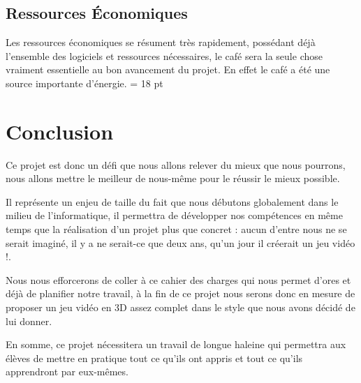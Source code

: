 \documentclass[12pt,a4paper]{article}
\begin{document}
\subsection{Ressources Économiques}
Les ressources économiques se résument très rapidement, possédant déjà l'ensemble des logiciels et ressources nécessaires, le café sera la seule chose vraiment essentielle au bon avancement du projet. En effet le café a été une source importante d'énergie.
\newpage
\baselineskip = 18 pt
\section{Conclusion}
Ce projet est donc un défi que nous allons relever du mieux que nous pourrons, nous allons mettre le meilleur de nous-même pour le réussir le mieux possible.

Il représente un enjeu de taille du fait que nous débutons globalement dans le milieu de l'informatique, il permettra de développer nos compétences en même temps que la réalisation d'un projet plus que concret : aucun d'entre nous ne se serait imaginé, il y a ne serait-ce que deux ans, qu'un jour il créerait un jeu vidéo !.

Nous nous efforcerons de coller à ce cahier des charges qui nous permet d'ores et déjà de planifier notre travail, à la fin de ce projet nous serons donc en mesure de proposer un jeu vidéo en 3D assez complet dans le style que nous avons décidé de lui donner.

En somme, ce projet nécessitera un travail de longue haleine qui permettra aux élèves de mettre en pratique tout ce qu'ils ont appris et tout ce qu'ils apprendront par eux-mêmes.
\end{document}
